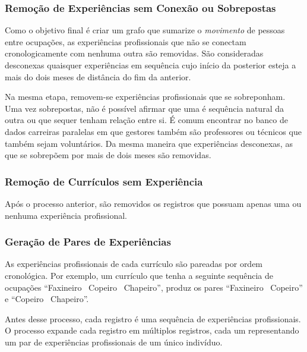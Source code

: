 \documentclass[12pt,a4paper]{article}
\begin{document}

\subsubsection{Remoção de Experiências sem Conexão ou Sobrepostas}

Como o objetivo final é criar um grafo que sumarize o \textit{movimento} de pessoas entre ocupações, as experiências profissionais que não se conectam cronologicamente com nenhuma outra são removidas. São consideradas desconexas quaisquer experiências em sequência cujo início da posterior esteja a mais do dois meses de distância do fim da anterior.


Na mesma etapa, removem-se experiências profissionais que se sobreponham. Uma vez sobrepostas, não é possível afirmar que uma é sequência natural da outra ou que sequer tenham relação entre si. É comum encontrar no banco de dados carreiras paralelas em que gestores também são professores ou técnicos que também sejam voluntários. Da mesma maneira que experiências desconexas, as que se sobrepõem por mais de dois meses são removidas.

\subsubsection{Remoção de Currículos sem Experiência}

Após o processo anterior, são removidos os registros que possuam apenas uma ou nenhuma experiência profissional.

\subsubsection{Geração de Pares de Experiências}

As experiências profissionais de cada currículo são pareadas por ordem cronológica. Por exemplo, um currículo que tenha a seguinte sequência de ocupações \enquote{Faxineiro \textrightarrow~Copeiro \textrightarrow~Chapeiro}, produz os pares \enquote{Faxineiro \textrightarrow~Copeiro} e \enquote{Copeiro \textrightarrow~Chapeiro}.

Antes desse processo, cada registro é uma sequência de experiências profissionais. O processo expande cada registro em múltiplos registros, cada um representando um par de experiências profissionais de um único indivíduo.
\end{document}
